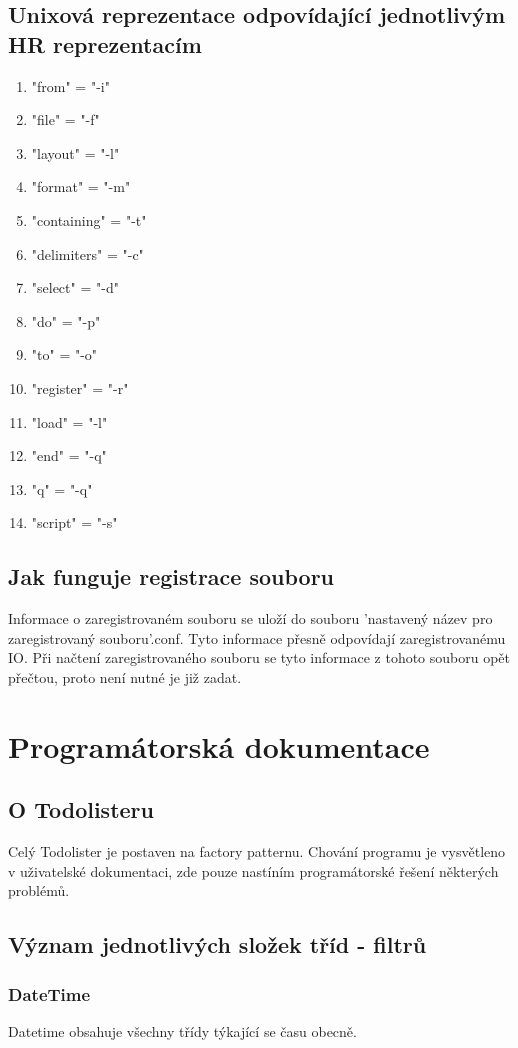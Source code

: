 \documentclass[11pt]{article}
\begin{document}
\subsection{Unixová reprezentace odpovídající jednotlivým HR reprezentacím}
\begin{enumerate}[leftmargin=5mm]
\item "from" = "-i"
\item "file" = "-f"
\item "layout" = "-l"
\item "format" = "-m"
\item "containing" = "-t"
\item "delimiters" = "-c"
\item "select" = "-d"
\item "do" = "-p"
\item "to" = "-o"
\item "register" = "-r"
\item "load" = "-l"
\item "end" = "-q"
\item "q" = "-q"
\item "script" = "-s"
\end{enumerate}

\subsection{Jak funguje registrace souboru}
Informace o zaregistrovaném souboru se uloží do souboru 'nastavený název pro zaregistrovaný souboru'.conf. Tyto informace přesně odpovídají zaregistrovanému IO. Při načtení zaregistrovaného souboru se tyto informace z tohoto souboru opět přečtou, proto není nutné je již zadat.
\newpage

\section{Programátorská dokumentace}
\subsection{O Todolisteru}
Celý Todolister je postaven na factory patternu. Chování programu je vysvětleno v uživatelské dokumentaci, zde pouze nastíním programátorské řešení některých problémů.
\subsection{Význam jednotlivých složek tříd - filtrů}
\subsubsection{DateTime}
Datetime obsahuje všechny třídy týkající se času obecně.
\end{document}
